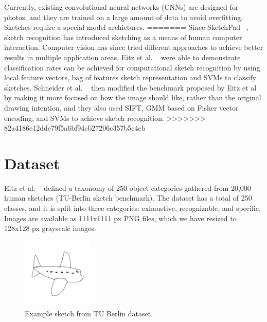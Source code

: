\documentclass[10pt,twocolumn,letterpaper]{article}
\begin{document}
Currently, existing convolutional neural networks (CNNs) are designed for photos, and they are trained on a large amount of data to avoid overfitting.  Sketches require a special model archietures.  
=======
Since SketchPad ~\cite{sutherland1964sketchpad}, sketch recognition has introduced sketching as a means of human computer interaction. Computer vision has since tried different approaches to achieve better results in multiple application areas. Eitz et al. ~\cite{eitz2012hdhso} were able to demonstrate classification rates can be achieved for computational sketch recognition by using local feature vectors, bag of features sketch representation and SVMs to classify sketches. Schneider et al. ~\cite{schneider2014sketch} then modified the benchmark proposed by Eitz et al ~\cite{eitz2012hdhso} by making it more focused on how the image should like, rather than the original drawing intention, and they also used SIFT, GMM based on Fisher vector encoding, and SVMs to achieve sketch recognition. 
>>>>>>> 82a4186e12dde79f5a6bf94cb27206c357b5c4cb




\section{Dataset}
Eitz et al. ~\cite{eitz2012hdhso} defined a taxonomy of 250 object categories gathered from 20,000 human sketches (TU-Berlin sketch benchmark). The dataset has a total of 250 classes, and it is split into three categories: exhaustive, recognizable, and specific. Images are available as 1111x1111 px PNG files, which we have resized to 128x128 px grayscale images.

\begin{figure}[h]
	\begin{center}
	\includegraphics[width=0.5\linewidth]{airplane}
	\caption{Example sketch from TU Berlin dataset.}
	\end{center}
\end{figure}
\end{document}
